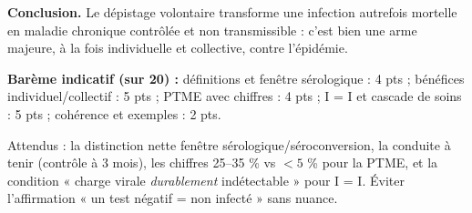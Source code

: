 \documentclass[11pt]{article}
\begin{document}
\begin{corrige}
\textbf{Conclusion.} Le dépistage volontaire transforme une infection autrefois mortelle en maladie chronique contrôlée et non transmissible : c'est bien une arme majeure, à la fois individuelle et collective, contre l'épidémie.

\textbf{Barème indicatif (sur 20) :} définitions et fenêtre sérologique : 4 pts ; bénéfices individuel/collectif : 5 pts ; PTME avec chiffres : 4 pts ; I = I et cascade de soins : 5 pts ; cohérence et exemples : 2 pts.
\begin{attention}
Attendus : la distinction nette fenêtre sérologique/séroconversion, la conduite à tenir (contrôle à 3 mois), les chiffres 25--35 \% vs $< 5$ \% pour la PTME, et la condition « charge virale \emph{durablement} indétectable » pour I = I. Éviter l'affirmation « un test négatif = non infecté » sans nuance.
\end{attention}
\end{corrige}
\end{document}
